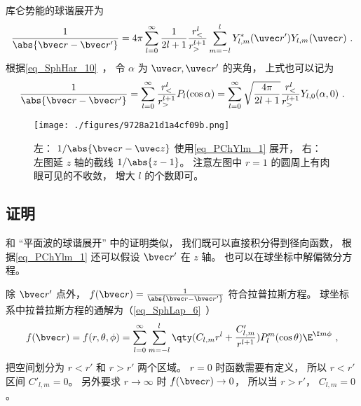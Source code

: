 
\begin{issues}
\issueDraft
\end{issues}


库仑势能的球谐展开为
\begin{equation}
\frac{1}{\abs{\bvec r - \bvec r'}} = 4\pi \sum_{l=0}^{\infty} \frac{1}{2l+1} \frac{r_<^l}{r_>^{l+1}} \sum_{m = -l}^l Y_{l,m}^*(\uvec r') Y_{l,m}(\uvec r)~.
\end{equation}
根据\autoref{eq_SphHar_10}~， 令 $\alpha$ 为 $\uvec r, \uvec r'$ 的夹角， 上式也可以记为
\begin{equation}\label{eq_PChYlm_1}
\frac{1}{\abs{\bvec r - \bvec r'}} = \sum_{l=0}^{\infty} \frac{r_<^l}{r_>^{l+1}} P_l(\cos\alpha) = \sum_{l=0}^{\infty} \sqrt{\frac{4\pi}{2l+1}} \frac{r_<^l}{r_>^{l+1}} Y_{l,0}(\alpha, 0)~.
\end{equation}

\begin{figure}[ht]
\centering
\texttt{[image: ./figures/9728a21d1a4cf09b.png]}
\caption{左： $1/\abs{\bvec r - \uvec z}$ 使用\autoref{eq_PChYlm_1} 展开， 右： 左图延 $z$ 轴的截线 $1/\abs{z - 1}$。 注意左图中 $r = 1$ 的圆周上有肉眼可见的不收敛， 增大 $l$ 的个数即可。} \label{fig_PChYlm_1}
\end{figure}

\subsection{证明}
和 “平面波的球谐展开” 中的证明类似， 我们既可以直接积分得到径向函数， 根据\autoref{eq_PChYlm_1} 还可以假设 $\bvec r'$ 在 $z$ 轴。 也可以在球坐标中解偏微分方程。

除 $\bvec r'$ 点外， $f(\bvec r) = \frac{1}{\abs{\bvec r - \bvec r'}}$ 符合拉普拉斯方程。 球坐标系中拉普拉斯方程的通解为（\autoref{eq_SphLap_6}~）
\begin{equation}
f(\bvec r) = f(r, \theta, \phi) = \sum_{l = 0}^\infty \sum_{m = -l}^l \qty(C_{l,m} r^l + \frac{C'_{l,m}}{r^{l+1}})P_l^m(\cos\theta)\E^{\I m\phi}~,
\end{equation}
把空间划分为 $r < r'$ 和 $r > r'$ 两个区域。 $r = 0$ 时函数需要有定义， 所以 $r < r'$ 区间 $C'_{l,m} = 0$。 另外要求 $r \to \infty$ 时 $f(\bvec r) \to 0$， 所以当 $r > r'$， $C_{l,m} = 0$。

